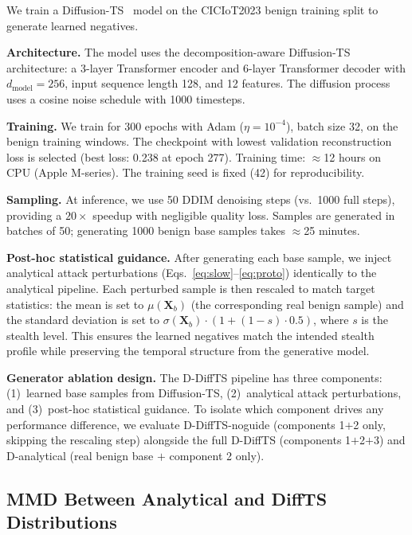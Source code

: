 We train a Diffusion-TS~\cite{zhang2024diffusionts} model on the
CICIoT2023 benign training split to generate learned negatives.

\textbf{Architecture.}
The model uses the decomposition-aware Diffusion-TS architecture:
a 3-layer Transformer encoder and 6-layer Transformer decoder with
$d_{\text{model}}{=}256$, input sequence length 128, and 12 features.
The diffusion process uses a cosine noise schedule with 1000 timesteps.

\textbf{Training.}
We train for 300 epochs with Adam ($\eta{=}10^{-4}$), batch size 32,
on the benign training windows.
The checkpoint with lowest validation reconstruction loss is selected
(best loss: 0.238 at epoch 277).
Training time: $\approx$12 hours on CPU (Apple M-series).
The training seed is fixed (42) for reproducibility.

\textbf{Sampling.}
At inference, we use 50 DDIM denoising steps (vs.\ 1000 full steps),
providing a $20\times$ speedup with negligible quality loss.
Samples are generated in batches of 50; generating 1000 benign
base samples takes $\approx$25 minutes.

\textbf{Post-hoc statistical guidance.}
After generating each base sample, we inject analytical attack
perturbations (Eqs.~\ref{eq:slow}--\ref{eq:proto}) identically to
the analytical pipeline.
Each perturbed sample is then rescaled to match target statistics:
the mean is set to $\mu(\mathbf{X}_b)$ (the corresponding real
benign sample) and the standard deviation is set to
$\sigma(\mathbf{X}_b) \cdot (1 + (1{-}s) \cdot 0.5)$, where $s$
is the stealth level.
This ensures the learned negatives match the intended stealth
profile while preserving the temporal structure from the generative
model.

\textbf{Generator ablation design.}
The D-DiffTS pipeline has three components: (1)~learned base samples
from Diffusion-TS, (2)~analytical attack perturbations, and (3)~post-hoc
statistical guidance.
To isolate which component drives any performance difference, we
evaluate D-DiffTS-noguide (components 1$+$2 only, skipping the rescaling
step) alongside the full D-DiffTS (components 1$+$2$+$3) and
D-analytical (real benign base $+$ component 2 only).

\subsection{MMD Between Analytical and DiffTS Distributions}
\label{app:mmd}

